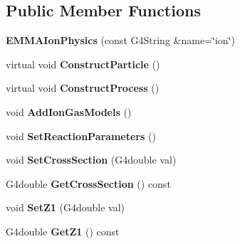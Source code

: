 \subsection*{Public Member Functions}
\begin{DoxyCompactItemize}
\item 
\hypertarget{classEMMAIonPhysics_a40c40de5ebabb9252b69d0dfe5a215f8}{{\bfseries E\-M\-M\-A\-Ion\-Physics} (const G4\-String \&name=\char`\"{}ion\char`\"{})}\label{classEMMAIonPhysics_a40c40de5ebabb9252b69d0dfe5a215f8}

\item 
\hypertarget{classEMMAIonPhysics_a2645db403cd4d1823024336a059b50e8}{virtual void {\bfseries Construct\-Particle} ()}\label{classEMMAIonPhysics_a2645db403cd4d1823024336a059b50e8}

\item 
\hypertarget{classEMMAIonPhysics_a2dc6a25dd215b9d604c313e47cdecb36}{virtual void {\bfseries Construct\-Process} ()}\label{classEMMAIonPhysics_a2dc6a25dd215b9d604c313e47cdecb36}

\item 
\hypertarget{classEMMAIonPhysics_a0bb62e529a70d49fefd583ba31db1ed8}{void {\bfseries Add\-Ion\-Gas\-Models} ()}\label{classEMMAIonPhysics_a0bb62e529a70d49fefd583ba31db1ed8}

\item 
\hypertarget{classEMMAIonPhysics_aaddc18739c8d93547d851738e592a6b3}{void {\bfseries Set\-Reaction\-Parameters} ()}\label{classEMMAIonPhysics_aaddc18739c8d93547d851738e592a6b3}

\item 
\hypertarget{classEMMAIonPhysics_a529e3e29ce819cb699180a6eb4d9a1bd}{void {\bfseries Set\-Cross\-Section} (G4double val)}\label{classEMMAIonPhysics_a529e3e29ce819cb699180a6eb4d9a1bd}

\item 
\hypertarget{classEMMAIonPhysics_a38f5f9f9598c5827868dbfd221d35574}{G4double {\bfseries Get\-Cross\-Section} () const }\label{classEMMAIonPhysics_a38f5f9f9598c5827868dbfd221d35574}

\item 
\hypertarget{classEMMAIonPhysics_a7c46375f17da96484c99652079dd08c8}{void {\bfseries Set\-Z1} (G4double val)}\label{classEMMAIonPhysics_a7c46375f17da96484c99652079dd08c8}

\item 
\hypertarget{classEMMAIonPhysics_a734a43dc9e13eb27b926a72fcedbe689}{G4double {\bfseries Get\-Z1} () const }\label{classEMMAIonPhysics_a734a43dc9e13eb27b926a72fcedbe689}


\end{DoxyCompactItemize}
